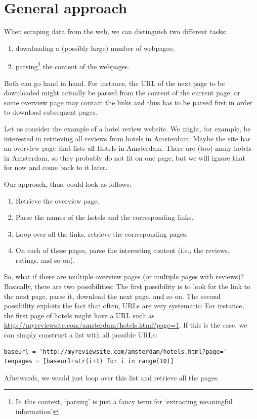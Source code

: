 \documentclass[a4paper,12pt]{book}
\begin{document}
\section{General approach}
\label{sec:generalapproachtoscraping}
When scraping data from the web, we can distinguish two different tasks:
\begin{enumerate}
	\item downloading a (possibly large) number of webpages; 
	\item parsing\footnote{In this context, `parsing' is just a fancy term for `extracting meaningful information'} the content of the webpages.
\end{enumerate}
Both can go hand in hand. For instance, the URL of the next page to be downloaded might actually be parsed from the content of the current page; or some overview page may contain the links and thus has to be parsed first in order to download subsequent pages.

Let us consider the example of a hotel review website. We might, for example, be interested in retrieving all reviews from hotels in Amsterdam.
Maybe the site has an overview page that lists all Hotels in Amsterdam. There are (too) many hotels in Amsterdam, so they probably do not fit on one page, but we will ignore that for now and come back to it later. 

Our approach, thus, could look as follows:

\begin{enumerate}
	\item Retrieve the overview page.
	\item Parse the names of the hotels and the corresponding links.
	\item Loop over all the links, retrieve the corresponding pages.
	\item On each of these pages, parse the interesting content (i.e., the reviews, ratings, and so on).
\end{enumerate}

So, what if there are multiple overview pages (or multiple pages with reviews)? Basically, there are two possibilities:
The first possibility is to look for the link to the next page, parse it, download the next page, and so on.
The second possibility exploits the fact that often, URLs are very systematic: For instance, the first page of hotels might have a URL such as \url{http://myreviewsite.com/amsterdam/hotels.html?page=1}.
If this is the case, we can simply construct a list with all possible URLs:
\begin{lstlisting}
baseurl = 'http://myreviewsite.com/amsterdam/hotels.html?page='
tenpages = [baseurl+str(i+1) for i in range(10)]
\end{lstlisting}
Afterwards, we would just loop over this list and retrieve all the pages.
\end{document}
